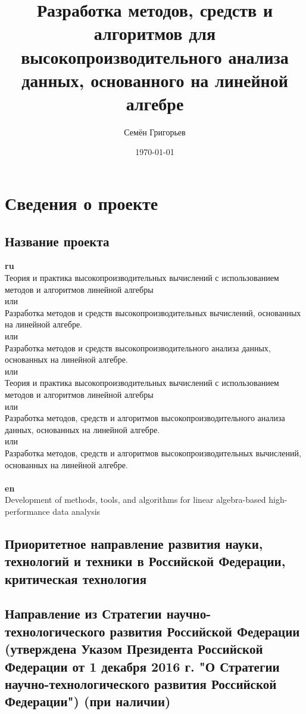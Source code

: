 \documentclass[12pt]{article}  %
\title{Разработка методов, средств и алгоритмов для высокопроизводительного анализа данных, основанного на линейной алгебре}
\author{Семён Григорьев}
\date{\today}
\theoremstyle{remark}
\begin{document}

\maketitle

\section{Сведения о проекте}

\subsection{Название проекта}

\textbf{ru}\\
%
Теория и практика высокопроизводительных вычислений с использованием методов и алгоритмов линейной алгебры
\\
или
\\
Разработка методов и средств высокопроизводительных вычислений, основанных на линейной алгебре.
\\
или
\\
Разработка методов и средств высокопроизводительного анализа данных, основанных на линейной алгебре.
\\
или
\\
Теория и практика высокопроизводительных вычислений с использованием методов и алгоритмов линейной алгебры
\\
или
\\
Разработка методов, средств и алгоритмов высокопроизводительного анализа данных, основанных на линейной алгебре.
\\
или
\\
Разработка методов, средств и алгоритмов высокопроизводительных вычислений, основанных на линейной алгебре.
\\
\\
\textbf{en}\\
Development of methods, tools, and algorithms for linear algebra-based high-performance data analysis

\subsection{Приоритетное направление развития науки, технологий и техники в Российской Федерации, критическая технология}
%


\subsection{Направление из Стратегии научно-технологического развития Российской Федерации (утверждена Указом Президента Российской Федерации от 1 декабря 2016 г.  "О Стратегии научно-технологического развития Российской Федерации") (при наличии)}
%
\end{document}
